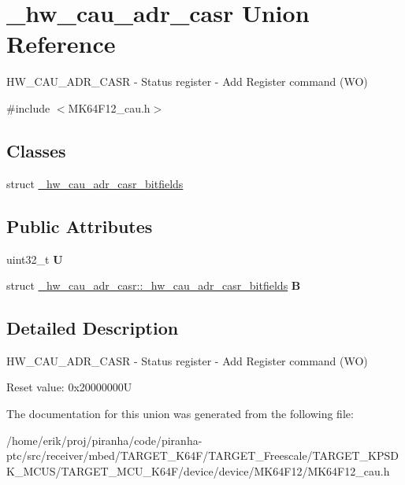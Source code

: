 \hypertarget{union__hw__cau__adr__casr}{}\section{\+\_\+hw\+\_\+cau\+\_\+adr\+\_\+casr Union Reference}
\label{union__hw__cau__adr__casr}


H\+W\+\_\+\+C\+A\+U\+\_\+\+A\+D\+R\+\_\+\+C\+A\+SR -\/ Status register -\/ Add Register command (WO)  




{\ttfamily \#include $<$M\+K64\+F12\+\_\+cau.\+h$>$}

\subsection*{Classes}
\begin{DoxyCompactItemize}
\item 
struct \hyperlink{struct__hw__cau__adr__casr_1_1__hw__cau__adr__casr__bitfields}{\+\_\+hw\+\_\+cau\+\_\+adr\+\_\+casr\+\_\+bitfields}
\end{DoxyCompactItemize}
\subsection*{Public Attributes}
\begin{DoxyCompactItemize}
\item 
uint32\+\_\+t {\bfseries U}\hypertarget{union__hw__cau__adr__casr_a8dd0e2400f49b9b257db9a7151d05575}{}\label{union__hw__cau__adr__casr_a8dd0e2400f49b9b257db9a7151d05575}

\item 
struct \hyperlink{struct__hw__cau__adr__casr_1_1__hw__cau__adr__casr__bitfields}{\+\_\+hw\+\_\+cau\+\_\+adr\+\_\+casr\+::\+\_\+hw\+\_\+cau\+\_\+adr\+\_\+casr\+\_\+bitfields} {\bfseries B}\hypertarget{union__hw__cau__adr__casr_a8fd53d6bf06496d79eb741ed7eda6ad6}{}\label{union__hw__cau__adr__casr_a8fd53d6bf06496d79eb741ed7eda6ad6}

\end{DoxyCompactItemize}


\subsection{Detailed Description}
H\+W\+\_\+\+C\+A\+U\+\_\+\+A\+D\+R\+\_\+\+C\+A\+SR -\/ Status register -\/ Add Register command (WO) 

Reset value\+: 0x20000000U 

The documentation for this union was generated from the following file\+:\begin{DoxyCompactItemize}
\item 
/home/erik/proj/piranha/code/piranha-\/ptc/src/receiver/mbed/\+T\+A\+R\+G\+E\+T\+\_\+\+K64\+F/\+T\+A\+R\+G\+E\+T\+\_\+\+Freescale/\+T\+A\+R\+G\+E\+T\+\_\+\+K\+P\+S\+D\+K\+\_\+\+M\+C\+U\+S/\+T\+A\+R\+G\+E\+T\+\_\+\+M\+C\+U\+\_\+\+K64\+F/device/device/\+M\+K64\+F12/M\+K64\+F12\+\_\+cau.\+h\end{DoxyCompactItemize}
